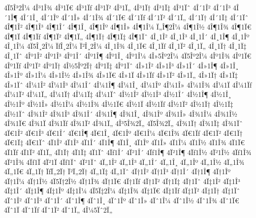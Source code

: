 {4Ï5Î³2Î¼   %
4Î³1Î¾
4Î³1Ï€
4Î³1Ïƒ 4Î³1Ï²
4Î³1Ï„
4Î³1Ï†
4Î³1Ï‡
4Î³1Ïˆ
4Î´1Î²
4Î´1Î³
4Î´1Î¶
4Î´1Î¸
4Î´1Îº
4Î´1Î»
4Î´1Î¾
4Î´1Ï€
4Î´1Ïƒ 4Î´1Ï²
4Î´1Ï„
4Î´1Ï†
4Î´1Ï‡
4Î´1Ïˆ
4Î¶1Î²   %
4Î¶1Î³   %
4Î¶1Î´
4Î¶1Î¸
4Î¶1Îº
4Î¶1Î»
4Î¶1Î¼
Ï„Î¶2Î¼   %
4Î¶1Î½
4Î¶1Î¾
4Î¶1Ï€
4Î¶1Ï
4Î¶1Ïƒ 4Î¶1Ï²
4Î¶1Ï„
4Î¶1Ï†
4Î¶1Ï‡
4Î¶1Ïˆ
4Î¸1Î²
4Î¸1Î³
4Î¸1Î´
4Î¸1Î¶
4Î¸1Îº
4Î¸1Î¼
4Ï5Î¸2Î¼   %
ÏƒÎ¸2Î¼ Ï²Î¸2Î¼   %
4Î¸1Î¾
4Î¸1Ï€
4Î¸1Ïƒ 4Î¸1Ï²
4Î¸1Ï„
4Î¸1Ï†
4Î¸1Ï‡
4Î¸1Ïˆ
4Îº1Î²   %
4Îº1Î³
4Îº1Î´
4Îº1Î¶
4Îº1Î¸
4Îº1Î¼
4Î»5Îº2Î¼   %
4Ï5Îº2Î¼   %
4Îº1Î¾
4Îº1Ï€
4Îº1Ïƒ 4Îº1Ï²
4Îº1Ï†
4Î½5Îº2Ï†   %
4Îº1Ï‡
4Îº1Ïˆ
4Î»1Î²
4Î»1Î³
4Î»1Î´
4Î»1Î¶
4Î»1Î¸
4Î»1Îº
4Î»1Î¼
4Î»1Î½
4Î»1Î¾
4Î»1Ï€
4Î»1Ï
4Î»1Ïƒ 4Î»1Ï²
4Î»1Ï„
4Î»1Ï†
4Î»1Ï‡
4Î»1Ïˆ
4Î¼1Î²
4Î¼1Î³
4Î¼1Î´
4Î¼1Î¶
4Î¼1Î¸
4Î¼1Îº
4Î¼1Î»
4Î¼1Î¾
4Î¼1Ï
4Î¼1Ïƒ 4Î¼1Ï²
4Î¼1Ï„
4Î¼1Ï†
4Î¼1Ï‡
4Î¼1Ïˆ
4Î½1Î²
4Î½1Î³
4Î½1Î´
4Î½1Î¶
4Î½1Î¸
4Î½1Îº
4Î½1Î»
4Î½1Î¼
4Î½1Î¾
4Î½1Ï€
4Î½1Ï
4Î½1Ïƒ 4Î½1Ï²
4Î½1Ï†
4Î½1Ï‡
4Î½1Ïˆ
4Î¾1Î²
4Î¾1Î³
4Î¾1Î´
4Î¾1Î¶
4Î¾1Î¸
4Î¾1Îº
4Î¾1Î»
4Î¾1Î¼
4Î¾1Î½
4Î¾1Ï€
4Î¾1Ï
4Î¾1Ïƒ 4Î¾1Ï²
4Î¾1Ï„
4Î³5Î¾2Ï„   %
4Ï5Î¾2Ï„   %
4Î¾1Ï†
4Î¾1Ï‡
4Î¾1Ïˆ
4Ï€1Î²
4Ï€1Î³
4Ï€1Î´
4Ï€1Î¶
4Ï€1Î¸
4Ï€1Îº
4Ï€1Î¼
4Ï€1Î¾
4Ï€1Ïƒ 4Ï€1Ï²
4Ï€1Ï†
4Ï€1Ï‡
4Ï€1Ïˆ
4Ï1Î²
4Ï1Î³
4Ï1Î´
4Ï1Î¶
4Ï1Î¸
4Ï1Îº
4Ï1Î»
4Ï1Î¼
4Ï1Î½
4Ï1Î¾
4Ï1Ï€
4Ï1Ïƒ 4Ï1Ï²
4Ï1Ï„
4Ï1Ï†
4Ï1Ï‡
4Ï1Ïˆ
4Ïƒ1Î´ 4Ï²1Î´   %
4Ïƒ1Î¶ 4Ï²1Î¶
4Ïƒ1Î½ 4Ï²1Î½   %
4Ïƒ1Î¾ 4Ï²1Î¾
4Ïƒ1Ï 4Ï²1Ï
4Ïƒ1Ïˆ 4Ï²1Ïˆ
4Ï„1Î²
4Ï„1Î³
4Ï„1Î´
4Ï„1Î¸
4Ï„1Îº
4Ï„1Î½
4Ï„1Î¾
4Ï„1Ï€
4Ï„1Ï†
ÏƒÏ„2Ï† Ï²Ï„2Ï†   %
4Ï„1Ï‡
4Ï„1Ïˆ
4Ï†1Î²
4Ï†1Î³
4Ï†1Î´
4Ï†1Î¶
4Ï†1Îº   %
4Ï†1Î¼
4Ï†1Î½
4Ï5Ï†2Î½   %
4Ï†1Î¾
4Ï†1Ï€
4Ï†1Ïƒ 4Ï†1Ï²
4Ï†1Ï‡
4Ï†1Ïˆ
4Ï‡1Î²
4Ï‡1Î³
4Ï‡1Î´
4Ï‡1Î¶
4Ï‡1Îº
4Ï‡1Î¼
4Ï5Ï‡2Î¼   %
4Ï‡1Î¾
4Ï‡1Ï€
4Ï‡1Ïƒ 4Ï‡1Ï²
4Ï‡1Ï†
4Ï‡1Ïˆ
4Ïˆ1Î²
4Ïˆ1Î³
4Ïˆ1Î´
4Ïˆ1Î¶
4Ïˆ1Î¸
4Ïˆ1Îº
4Ïˆ1Î»
4Ïˆ1Î¼
4Ïˆ1Î½
4Ïˆ1Î¾
4Ïˆ1Ï€
4Ïˆ1Ï
4Ïˆ1Ïƒ 4Ïˆ1Ï²
4Ïˆ1Ï„
4Î¼5Ïˆ2Ï„   %
}

